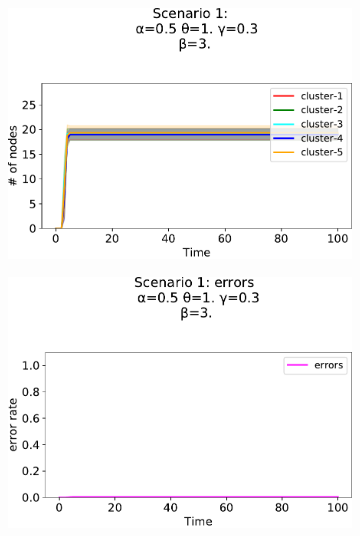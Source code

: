 \begin{figure}[!ht]
  \begin{subfigure}[b]{0.32\textwidth}
    \centering
    \includegraphics[width=\textwidth]{papers/swarm-intelligence2021/img/simulations/standard-count_0_034567_α-0.5_θ-1._γ-0.3_β-3._ω-0._ζ-0..pdf}
  \end{subfigure}
  \hfill
  \begin{subfigure}[b]{0.32\textwidth}
    \centering
    \includegraphics[width=\textwidth]{papers/swarm-intelligence2021/img/simulations/standard-errors_0_08_α-0.5_θ-1._γ-0.3_β-3._ω-0._ζ-0..pdf}
  \end{subfigure}
  \hfill
  \begin{subfigure}[b]{0.32\textwidth}
    \centering

\end{subfigure}
\end{figure}
